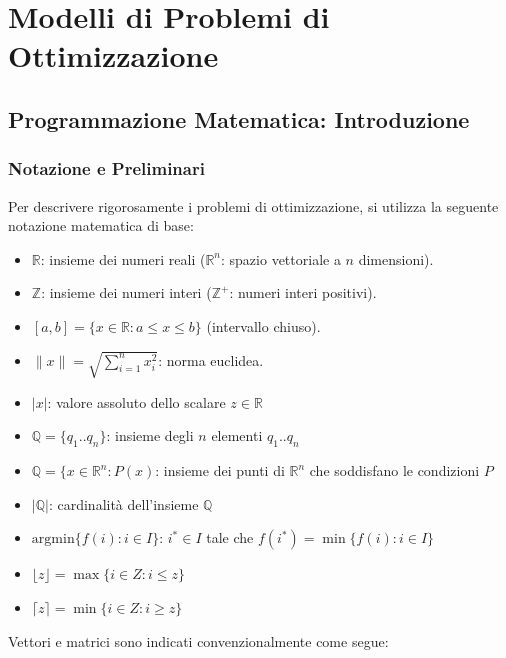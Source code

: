\documentclass[12pt]{extarticle} %
\begin{document}
\newpage

\section{Modelli di Problemi di Ottimizzazione}

\subsection{Programmazione Matematica: Introduzione}

\subsubsection{Notazione e Preliminari}
Per descrivere rigorosamente i problemi di ottimizzazione, si utilizza la seguente notazione matematica di base:
\begin{itemize}
    \item $\mathbb{R}$: insieme dei numeri reali ($\mathbb{R}^n$: spazio vettoriale a $n$ dimensioni).
    \item $\mathbb{Z}$: insieme dei numeri interi ($\mathbb{Z}^+$: numeri interi positivi).
    \item $[a,b] = \{x \in \mathbb{R} : a \le x \le b\}$ (intervallo chiuso).
    \item $\|x\| = \sqrt{\sum_{i=1}^{n} x_i^2}$: norma euclidea.
    \item $|x|$: valore assoluto dello scalare $z\in \mathbb{R}$
    \item $\mathbb{Q}=\{q_1..q_n\}$: insieme degli $n$ elementi $q_1..q_n$
    \item $\mathbb{Q}=\{x\in \mathbb{R}^n:P(x)$: insieme dei punti di $\mathbb{R}^n$ che soddisfano le condizioni $P$
    \item $|\mathbb{Q}|$: cardinalità dell'insieme $\mathbb{Q}$
    \item $\mathrm{argmin}\{f(i) : i \in I\}$: $i^* \in I$ tale che $f(i^*) = \min\{f(i) : i \in I\}$
    \item $\lfloor z \rfloor=\max \{i\in Z:i\le z\}$
    \item $\lceil z \rceil=\min\{i\in Z:i\ge z\}$
\end{itemize}
Vettori e matrici sono indicati convenzionalmente come segue:
\end{document}
